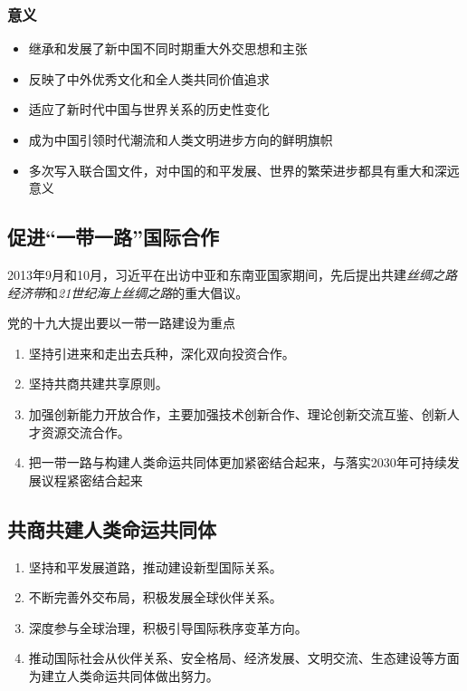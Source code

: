         \subsubsection{意义}
        \begin{itemize}
            \item 继承和发展了新中国不同时期重大外交思想和主张
            \item 反映了中外优秀文化和全人类共同价值追求
            \item 适应了新时代中国与世界关系的历史性变化
            \item 成为中国引领时代潮流和人类文明进步方向的鲜明旗帜
            \item 多次写入联合国文件，对中国的和平发展、世界的繁荣进步都具有重大和深远意义
        \end{itemize}

    \subsection{促进“一带一路”国际合作}
        2013年9月和10月，习近平在出访中亚和东南亚国家期间，先后提出共建\emph{丝绸之路经济带}和\emph{21世纪海上丝绸之路}的重大倡议。

        党的十九大提出要以一带一路建设为重点
        \begin{enumerate}
            \item 坚持引进来和走出去兵种，深化双向投资合作。
            \item 坚持共商共建共享原则。
            \item 加强创新能力开放合作，主要加强技术创新合作、理论创新交流互鉴、创新人才资源交流合作。
            \item 把一带一路与构建人类命运共同体更加紧密结合起来，与落实2030年可持续发展议程紧密结合起来
        \end{enumerate}

    \subsection{共商共建人类命运共同体}
        \begin{enumerate}
            \item 坚持和平发展道路，推动建设新型国际关系。
            \item 不断完善外交布局，积极发展全球伙伴关系。
            \item 深度参与全球治理，积极引导国际秩序变革方向。
            \item 推动国际社会从伙伴关系、安全格局、经济发展、文明交流、生态建设等方面为建立人类命运共同体做出努力。
        \end{enumerate}
